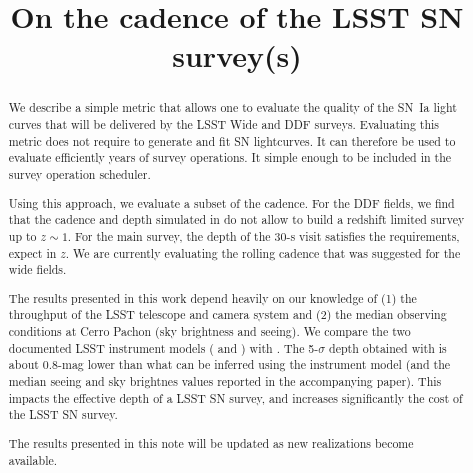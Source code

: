 \documentclass[\docopts]{\docclass}
\begin{document}
\title{ On the cadence of the LSST SN survey(s) }

\maketitlepre

\begin{abstract}

  
  We describe a simple metric that allows one to evaluate the quality of
  the SN~Ia light curves that will be delivered by the LSST Wide and
  DDF surveys.  Evaluating this metric does not require to generate
  and fit SN lightcurves.  It can therefore be used to evaluate
  efficiently years of survey operations. It simple enough to be
  included in the survey operation scheduler.
  
  Using this approach, we evaluate a subset of the 
   cadence.  For the DDF fields, we find that the
  cadence and depth simulated in  do not allow to
  build a redshift limited survey up to $z \sim 1$. For the main
  survey, the depth of the 30-s visit satisfies the requirements,
  expect in $z$.  We are currently evaluating the rolling cadence that
  was suggested for the wide fields.

  The results presented in this work depend heavily on our knowledge
  of (1) the throughput of the LSST telescope and camera system and
  (2) the median observing conditions at Cerro Pachon (sky brightness
  and seeing).  We compare the two documented LSST instrument models
  ( and ) with .  The
  5-$\sigma$ depth obtained with  is about 0.8-mag
  lower than what can be inferred using the  instrument
  model (and the median seeing and sky brightnes values reported in
  the accompanying paper).  This impacts the effective depth of a LSST
  SN survey, and increases significantly the cost of the LSST SN survey.
  
  The results presented in this note will be updated as new
   realizations become available.
\end{abstract}


\maketitlepost

% 
\newpage
\end{document}
